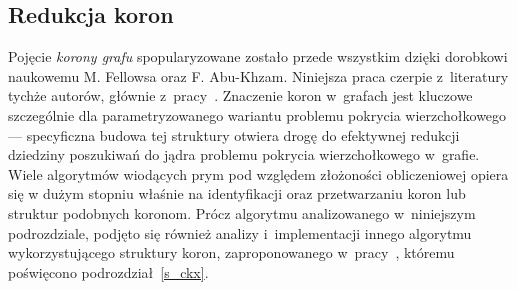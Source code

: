 \subsection{Redukcja koron}
\label{ss_kernelization_crown_reduction}
\par{
  Pojęcie \emph{korony grafu} spopularyzowane zostało przede wszystkim dzięki dorobkowi naukowemu M. Fellowsa oraz F. Abu-Khzam.
  Niniejsza praca czerpie z~literatury tychże autorów, głównie z~pracy~\cite{KernelizationAlgorithms04}.
  Znaczenie koron w~grafach jest kluczowe szczególnie dla parametryzowanego wariantu problemu pokrycia wierzchołkowego --- specyficzna budowa tej struktury otwiera drogę do efektywnej redukcji dziedziny poszukiwań do jądra problemu pokrycia wierzchołkowego w~grafie.
  Wiele algorytmów wiodących prym pod względem złożoności obliczeniowej opiera się w dużym stopniu właśnie na identyfikacji oraz przetwarzaniu koron lub struktur podobnych koronom.
  Prócz algorytmu analizowanego w~niniejszym podrozdziale, podjęto się również analizy i~implementacji innego algorytmu wykorzystującego struktury koron, zaproponowanego w~pracy~\cite{ImprovedBounds10}, któremu poświęcono podrozdział~\ref{s_ckx}.
}
